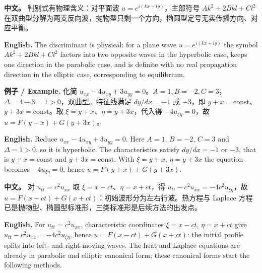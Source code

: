 \documentclass[UTF8,11pt,a4paper]{ctexart}
\newcommand{\EN}[1]{\par\noindent \textbf{English.} #1\par}
\newcommand{\EX}[2]{\par\noindent \textbf{例子 / Example.} #1\par\EN{#2}}
\newcommand{\APS}[2]{\par\noindent\textbf{中文。} #1\par\noindent\textbf{English.} #2\par\smallskip}
\begin{document}
\APS{判别式有物理含义：对平面波 $u=e^{i(kx+ly)}$，主部符号 $Ak^2+2Bkl+Cl^2$ 在双曲型分解为两支反向波，抛物型只剩一个方向，椭圆型定号无实传播方向、对应平衡。}{The discriminant is physical: for a plane wave $u=e^{i(kx+ly)}$ the symbol $Ak^2+2Bkl+Cl^2$ factors into two opposite waves in the hyperbolic case, keeps one direction in the parabolic case, and is definite with no real propagation direction in the elliptic case, corresponding to equilibrium.}
\EX{化简 $u_{xx}-4u_{xy}+3u_{yy}=0$。$A=1,B=-2,C=3$，$\Delta=4-3=1>0$，双曲型。特征线满足 $dy/dx=-1$ 或 $-3$，即 $y+x=\text{const}$、$y+3x=\text{const}$。取 $\xi=y+x$、$\eta=y+3x$，代入得 $-4u_{\xi\eta}=0$，故 $u=F(y+x)+G(y+3x)$。}{Reduce $u_{xx}-4u_{xy}+3u_{yy}=0$. Here $A=1$, $B=-2$, $C=3$ and $\Delta=1>0$, so it is hyperbolic. The characteristics satisfy $dy/dx=-1$ or $-3$, that is $y+x=\text{const}$ and $y+3x=\text{const}$. With $\xi=y+x$, $\eta=y+3x$ the equation becomes $-4u_{\xi\eta}=0$, hence $u=F(y+x)+G(y+3x)$.}
\APS{对 $u_{tt}=c^2u_{xx}$ 取 $\xi=x-ct$、$\eta=x+ct$，得 $u_{tt}-c^2u_{xx}=-4c^2u_{\xi\eta}$，故 $u=F(x-ct)+G(x+ct)$：初始波形分为左右行波。热方程与 Laplace 方程已是抛物型、椭圆型标准形，三类标准形是后续方法的出发点。}{For $u_{tt}=c^2u_{xx}$, characteristic coordinates $\xi=x-ct$, $\eta=x+ct$ give $u_{tt}-c^2u_{xx}=-4c^2u_{\xi\eta}$, hence $u=F(x-ct)+G(x+ct)$: the initial profile splits into left- and right-moving waves. The heat and Laplace equations are already in parabolic and elliptic canonical form; these canonical forms start the following methods.}
\end{document}
